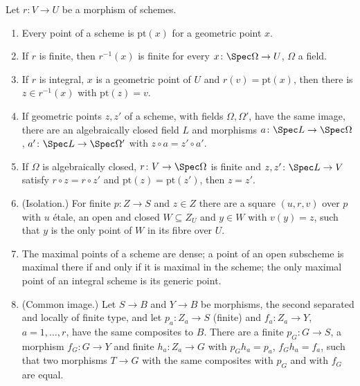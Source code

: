 \begin{lemma}\label{lem:pf:steps2:gpts}
Let $r\colon V\to U$ be a morphism of schemes.
\begin{enumerate}[label=\textup{(\alph*)},nosep]
\item Every point of a scheme is $\mathrm{pt}(x)$ for a geometric point $x$.
\item If $r$ is finite, then $r^{-1}(x)$ is finite for every $x\colon\Spec\Omega\to U$, $\Omega$ a field.
\item If $r$ is integral, $x$ is a geometric point of $U$ and $r(v)=\mathrm{pt}(x)$, then there is
  $z\in r^{-1}(x)$ with $\mathrm{pt}(z)=v$.
\item If geometric points $z,z'$ of a scheme, with fields $\Omega,\Omega'$, have the same image, there
  are an algebraically closed field $L$ and morphisms $a\colon\Spec L\to\Spec\Omega$,
  $a'\colon\Spec L\to\Spec\Omega'$ with $z\circ a=z'\circ a'$.
\item If $\Omega$ is algebraically closed, $r\colon V\to\Spec\Omega$ is finite and $z,z'\colon\Spec
  L\to V$ satisfy $r\circ z=r\circ z'$ and $\mathrm{pt}(z)=\mathrm{pt}(z')$, then $z=z'$.
\item \textup{(Isolation.)} For finite $p\colon Z\to S$ and $z\in Z$ there are a square $(u,r,v)$ over $p$
  with $u$ \'etale, an open and closed $W\subseteq Z_U$ and $y\in W$ with $v(y)=z$, such that $y$ is
  the only point of $W$ in its fibre over $U$.
\item The maximal points of a scheme are dense; a point of an open subscheme is maximal there if and
  only if it is maximal in the scheme; the only maximal point of an integral scheme is its generic
  point.
\item \textup{(Common image.)} Let $S\to B$ and $Y\to B$ be morphisms, the second separated and locally
  of finite type, and let $p_a\colon Z_a\to S$ \textup{(}finite\textup{)} and $f_a\colon Z_a\to Y$,
  $a=1,\dots,r$, have the same composites to $B$. There are a finite $p_G\colon G\to S$, a morphism
  $f_G\colon G\to Y$ and finite $h_a\colon Z_a\to G$ with $p_Gh_a=p_a$, $f_Gh_a=f_a$, such that two
  morphisms $T\to G$ with the same composites with $p_G$ and with $f_G$ are equal.
\end{enumerate}
\end{lemma}

